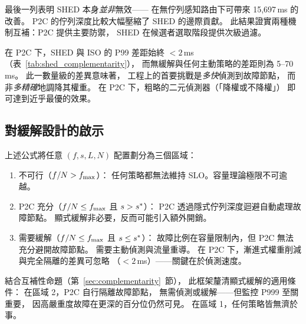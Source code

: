 最後一列表明 SHED 本身\emph{並非}無效——
在無佇列感知路由下可帶來 15,697\,ms 的改善。
P2C 的佇列深度比較大幅壓縮了 SHED 的邊際貢獻。
此結果證實兩種機制互補：P2C 提供主要防禦，
SHED 在候選者選取階段提供次級過濾。

\medskip

在 P2C 下，SHED 與 ISO 的 P99 差距始終 $< 2$\,ms
（表~\ref{tab:shed_complementarity}），
而無緩解與任何主動策略的差距則為 5--70\,ms。
此一數量級的差異意味著，
工程上的首要挑戰是\emph{多快}偵測到故障節點，
而非\emph{多精確}地調降其權重。
在 P2C 下，粗略的二元偵測器（「降權或不降權」）
即可達到近乎最優的效果。

\subsection{對緩解設計的啟示}

上述公式將任意 $(f, s, L, N)$ 配置劃分為三個區域：

\begin{enumerate}
\item 不可行（$f/N > f_{\max}$）：
  任何策略都無法維持 SLO。容量理論極限不可逾越。
\item P2C 充分（$f/N \leq f_{\max}$ 且 $s > s^{*}$）：
  P2C 透過隱式佇列深度迴避自動處理故障節點。
  顯式緩解非必要，反而可能引入額外開銷。
\item 需要緩解（$f/N \leq f_{\max}$ 且 $s \leq s^{*}$）：
  故障比例在容量限制內，但 P2C 無法充分避開故障節點。
  需要主動偵測與流量重導。
  在 P2C 下，漸進式權重削減與完全隔離的差異可忽略
  （$< 2$\,ms）——關鍵在於偵測速度。
\end{enumerate}

結合互補性命題（第~\ref{sec:complementarity}~節），
此框架釐清顯式緩解的適用條件：
在區域 2，P2C 自行隔離故障節點，
無需偵測或緩解——但監控 P999 至關重要，
因高嚴重度故障在更深的百分位仍然可見。
在區域 1，任何策略皆無濟於事。
